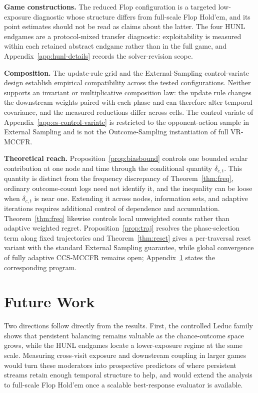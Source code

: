 \documentclass[11pt]{article}
\begin{document}
\textbf{Game constructions.} The reduced Flop configuration is a targeted low-exposure diagnostic whose structure differs from full-scale Flop Hold'em, and its point estimates should not be read as claims about the latter. The four HUNL endgames are a protocol-mixed transfer diagnostic: exploitability is measured within each retained abstract endgame rather than in the full game, and Appendix~\ref{app:hunl-details} records the solver-revision scope.

\textbf{Composition.} The update-rule grid and the External-Sampling control-variate design establish empirical compatibility across the tested configurations. Neither supports an invariant or multiplicative composition law: the update rule changes the downstream weights paired with each phase and can therefore alter temporal covariance, and the measured reductions differ across cells. The control variate of Appendix~\ref{app:es-control-variate} is restricted to the opponent-action sample in External Sampling and is not the Outcome-Sampling instantiation of full VR-MCCFR.

\textbf{Theoretical reach.} Proposition~\ref{prop:biasbound} controls one bounded scalar contribution at one node and time through the conditional quantity $\delta_{c,t}$. This quantity is distinct from the frequency discrepancy of Theorem~\ref{thm:freq}, ordinary outcome-count logs need not identify it, and the inequality can be loose when $\delta_{c,t}$ is near one. Extending it across nodes, information sets, and adaptive iterations requires additional control of dependence and accumulation. Theorem~\ref{thm:freq} likewise controls local unweighted counts rather than adaptive weighted regret. Proposition~\ref{prop:traj} resolves the phase-selection term along fixed trajectories and Theorem~\ref{thm:reset} gives a per-traversal reset variant with the standard External Sampling guarantee, while global convergence of fully adaptive CCS-MCCFR remains open; Appendix~\ref{app:future} states the corresponding program.

\section{Future Work}
\label{app:future}

Two directions follow directly from the results. First, the controlled Leduc family shows that persistent balancing remains valuable as the chance-outcome space grows, while the HUNL endgames locate a lower-exposure regime at the same scale. Measuring cross-visit exposure and downstream coupling in larger games would turn these moderators into prospective predictors of where persistent streams retain enough temporal structure to help, and would extend the analysis to full-scale Flop Hold'em once a scalable best-response evaluator is available.
\end{document}

